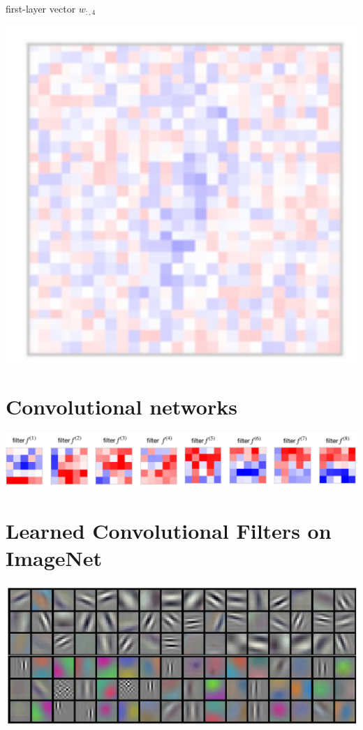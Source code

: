\documentclass[10pt]{article}
\begin{document}
first-layer vector $w_{:, 4}$

\begin{center}
\includegraphics[max width=\textwidth]{2024_01_08_959e2db67a31f073f6d2g-15}
\end{center}

\section*{Convolutional networks}
\begin{center}
\includegraphics[max width=\textwidth]{2024_01_08_959e2db67a31f073f6d2g-15(3)}
\end{center}

\section*{Learned Convolutional Filters on ImageNet}
\begin{center}
\includegraphics[max width=\textwidth]{2024_01_08_959e2db67a31f073f6d2g-16}
\end{center}
\end{document}
